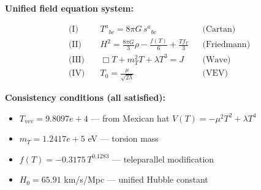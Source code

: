 
\textbf{Unified field equation system:}

\begin{align}
  \text{(I)} \quad & T^a{}_{bc} = 8\pi G \, s^a{}_{bc} && \text{(Cartan)} \\
  \text{(II)} \quad & H^2 = \frac{8\pi G}{3}\rho - \frac{f(T)}{6} + \frac{Tf_T}{3} && \text{(Friedmann)} \\
  \text{(III)} \quad & \Box T + m_T^2 T + \lambda T^3 = J && \text{(Wave)} \\
  \text{(IV)} \quad & T_0 = \frac{\mu}{\sqrt{2\lambda}} && \text{(VEV)}
\end{align}

\textbf{Consistency conditions (all satisfied):}
\begin{itemize}
  \item $T_{\text{vev}} = 9.8097e+4$ — from Mexican hat $V(T) = -\mu^2 T^2 + \lambda T^4$
  \item $m_T = 1.2417e+5$ eV — torsion mass
  \item $f(T) = -0.3175 \, T^{0.1283}$ — teleparallel modification
  \item $H_0 = 65.91$ km/s/Mpc — unified Hubble constant
\end{itemize}